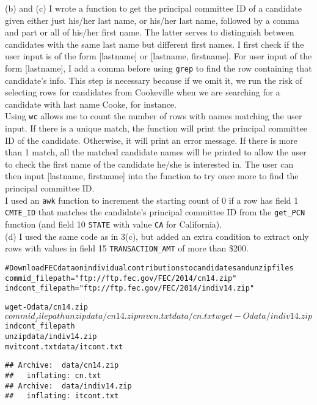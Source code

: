 \documentclass{article}\usepackage[]{graphicx}\usepackage[]{color}
\makeatletter
\newenvironment{kframe}{%
 \def\at@end@of@kframe{}%
 \ifinner\ifhmode%
  \def\at@end@of@kframe{\end{minipage}}%
  \begin{minipage}{\columnwidth}%
 \fi\fi%
 \def\FrameCommand##1{\hskip\@totalleftmargin \hskip-\fboxsep
 \colorbox{shadecolor}{##1}\hskip-\fboxsep
     \hskip-\linewidth \hskip-\@totalleftmargin \hskip\columnwidth}%
 \MakeFramed {\advance\hsize-\width
   \@totalleftmargin\z@ \linewidth\hsize
   \@setminipage}}%
 {\par\unskip\endMakeFramed%
 \at@end@of@kframe}
\newenvironment{knitrout}{}{} %
\makeatother
\begin{document}
(b) and (c) I wrote a function to get the principal committee ID of a candidate given either just his/her last name, or his/her last name, followed by a comma and part or all of his/her first name. The latter serves to distinguish between candidates with the same last name but different first names. I first check if the user input is of the form [lastname] or [lastname, firstname]. For user input of the form [lastname], I add a comma before using \texttt{grep} to find the row containing that candidate's info. This step is necessary because if we omit it, we run the risk of selecting rows for candidates from Cookeville when we are searching for a candidate with last name Cooke, for instance. \\

Using \texttt{wc} allows me to count the number of rows with names matching the user input. If there is a unique match, the function will print the principal committee ID of the candidate. Otherwise, it will print an error message. If there is more than 1 match, all the matched candidate names will be printed to allow the user to check the first name of the candidate he/she is interested in. The user can then input [lastname, firstname] into the function to try once more to find the principal committee ID. \\

I used an \texttt{awk} function to increment the starting count of 0 if a row has field 1 \texttt{CMTE\_ID} that matches the candidate's principal committee ID from the \texttt{get\_PCN} function (and field 10 \texttt{STATE} with value \texttt{CA} for California). \\

(d) I used the same code as in 3(c), but added an extra condition to extract only rows with values in field 15 \texttt{TRANSACTION\_AMT} of more than \$200.

\begin{knitrout}
\color{fgcolor}\begin{kframe}
\begin{alltt}
 # Download FEC data on individual contributions to candidates and unzip files
 commid_filepath="ftp://ftp.fec.gov/FEC/2014/cn14.zip"
 indcont_filepath="ftp://ftp.fec.gov/FEC/2014/indiv14.zip"

 wget -O data/cn14.zip $commid_filepath 
 unzip data/cn14.zip
 mv cn.txt data/cn.txt
 wget -O data/indiv14.zip $indcont_filepath
 unzip data/indiv14.zip
 mv itcont.txt data/itcont.txt

\end{alltt}

\begin{verbatim}
## Archive:  data/cn14.zip
##   inflating: cn.txt                  
## Archive:  data/indiv14.zip
##   inflating: itcont.txt
\end{verbatim}
\end{kframe}
\end{knitrout}
\end{document}
